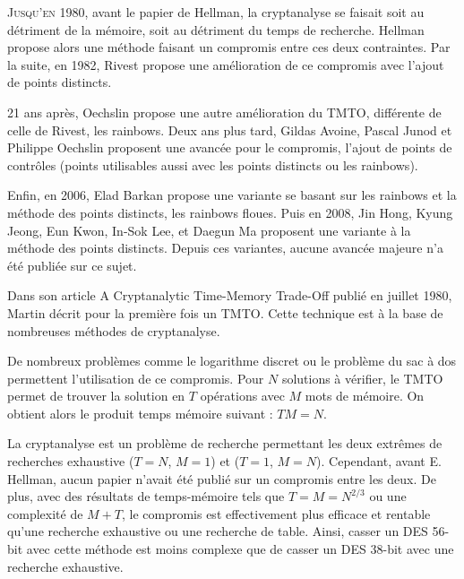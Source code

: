 

		\lettrine{J}{usqu'en 1980}, avant le papier de Hellman\cite{ehellman}, la cryptanalyse se faisait soit au détriment de la mémoire, soit au détriment du temps de recherche. Hellman propose alors une méthode faisant un compromis entre ces deux contraintes. Par la suite, en 1982, Rivest\cite{Rivest} propose une amélioration de ce compromis avec l'ajout de points distincts.

		\bigskip

		21 ans après, Oechslin\cite{Oech03} propose une autre amélioration du \gls{TMTO}, différente de celle de Rivest, les \glspl{rainbow}. Deux ans plus tard, Gildas Avoine, Pascal Junod et Philippe Oechslin\cite{checkpoints} proposent une avancée pour le compromis, l'ajout de points de contrôles (points utilisables aussi avec les points distincts ou les \glspl{rainbow}).

		\bigskip

		Enfin, en 2006, Elad Barkan propose une variante se basant sur les \glspl{rainbow} et la méthode des points distincts\cite{fuzzy}, les \glspl{rainbow} floues. Puis en 2008, Jin Hong, Kyung Jeong, Eun Kwon, In-Sok Lee, et Daegun Ma proposent une variante à la méthode des points distincts. Depuis ces variantes, aucune avancée majeure n'a été publiée sur ce sujet.


		Dans son article \og{}A Cryptanalytic Time-Memory Trade-Off\fg{}\cite{ehellman} publié en juillet 1980, Martin  décrit pour la première fois un \gls{TMTO}. Cette technique est à la base de nombreuses méthodes de cryptanalyse.

		\bigskip

		De nombreux problèmes comme le logarithme discret ou le problème du sac à dos permettent l'utilisation de ce compromis. Pour $N$ solutions à vérifier, le \gls{TMTO} permet de trouver la solution en $T$ opérations avec $M$ mots de mémoire. On obtient alors le produit temps mémoire suivant : $TM = N$.

		\bigskip

		La cryptanalyse est un problème de recherche permettant les deux extrêmes de recherches exhaustive ($T=N$, $M=1$) et ($T=1$, $M=N$). Cependant, avant E. Hellman\cite{ehellman}, aucun papier n'avait été publié sur un compromis entre les deux. De plus, avec des résultats de temps-mémoire tels que $T = M = N^{2/3}$ ou une complexité de $M + T$, le compromis est effectivement plus efficace et rentable qu'une recherche exhaustive ou une recherche de table. Ainsi, casser un DES 56-bit avec cette méthode est moins complexe que de casser un DES 38-bit avec une recherche exhaustive.

